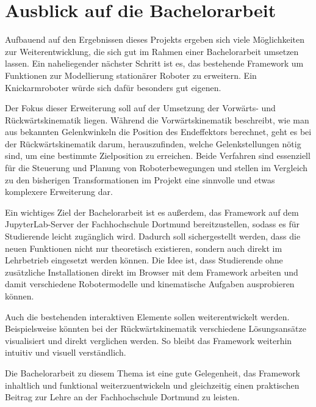 \section{Ausblick auf die Bachelorarbeit}

Aufbauend auf den Ergebnissen dieses Projekts ergeben sich viele Möglichkeiten zur Weiterentwicklung, die sich gut im Rahmen einer Bachelorarbeit umsetzen lassen.
Ein naheliegender nächster Schritt ist es, das bestehende Framework um Funktionen zur Modellierung stationärer Roboter zu erweitern. Ein Knickarmroboter würde sich dafür besonders gut eigenen.

Der Fokus dieser Erweiterung soll auf der Umsetzung der Vorwärts- und Rückwärtskinematik liegen. Während die Vorwärtskinematik beschreibt,
wie man aus bekannten Gelenkwinkeln die Position des Endeffektors berechnet, geht es bei der Rückwärtskinematik darum, herauszufinden,
welche Gelenkstellungen nötig sind, um eine bestimmte Zielposition zu erreichen.
Beide Verfahren sind essenziell für die Steuerung und Planung von Roboterbewegungen und stellen im
Vergleich zu den bisherigen Transformationen im Projekt eine sinnvolle und etwas komplexere Erweiterung dar.

Ein wichtiges Ziel der Bachelorarbeit ist es außerdem, das Framework auf dem JupyterLab-Server der Fachhochschule Dortmund bereitzustellen,
sodass es für Studierende leicht zugänglich wird. Dadurch soll sichergestellt werden, dass die neuen Funktionen nicht nur theoretisch existieren,
sondern auch direkt im Lehrbetrieb eingesetzt werden können. Die Idee ist,
dass Studierende ohne zusätzliche Installationen direkt im Browser mit dem Framework arbeiten und damit verschiedene Robotermodelle und kinematische Aufgaben ausprobieren können.

Auch die bestehenden interaktiven Elemente sollen weiterentwickelt werden.
Beispielsweise könnten bei der Rückwärtskinematik verschiedene Lösungsansätze visualisiert und direkt verglichen werden.
So bleibt das Framework weiterhin intuitiv und visuell verständlich.

Die Bachelorarbeit zu diesem Thema ist eine gute Gelegenheit,
das Framework inhaltlich und funktional weiterzuentwickeln und gleichzeitig einen praktischen Beitrag zur Lehre an der Fachhochschule Dortmund zu leisten.